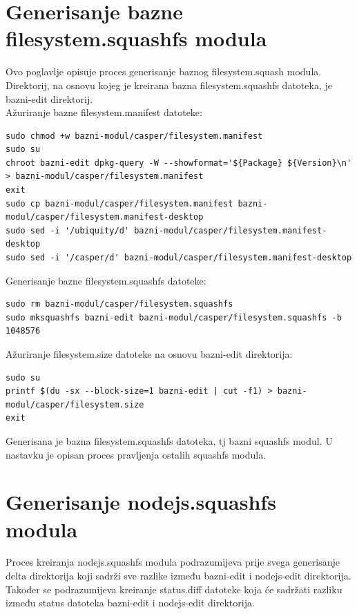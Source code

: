 \documentclass[12pt,vi]{mitthesis}
\begin{document}
\section*{Generisanje bazne filesystem.squashfs modula}
\indent
Ovo poglavlje opisuje proces generisanje baznog filesystem.squash modula. Direktorij, na osnovu kojeg je kreirana bazna filesystem.squashfs datoteka, je bazni-edit direktorij.\\
\noindent
Ažuriranje bazne filesystem.manifest datoteke:
\begin{lstlisting}[style=BashInputStyle]
sudo chmod +w bazni-modul/casper/filesystem.manifest
sudo su
chroot bazni-edit dpkg-query -W --showformat='${Package} ${Version}\n' > bazni-modul/casper/filesystem.manifest
exit
sudo cp bazni-modul/casper/filesystem.manifest bazni-modul/casper/filesystem.manifest-desktop
sudo sed -i '/ubiquity/d' bazni-modul/casper/filesystem.manifest-desktop
sudo sed -i '/casper/d' bazni-modul/casper/filesystem.manifest-desktop
\end{lstlisting}
\noindent
Generisanje bazne filesystem.squashfs datoteke:
\begin{lstlisting}[style=BashInputStyle]
sudo rm bazni-modul/casper/filesystem.squashfs
sudo mksquashfs bazni-edit bazni-modul/casper/filesystem.squashfs -b 1048576
\end{lstlisting}
\noindent
Ažuriranje filesystem.size datoteke na osnovu bazni-edit direktorija:
\begin{lstlisting}[style=BashInputStyle]
sudo su
printf $(du -sx --block-size=1 bazni-edit | cut -f1) > bazni-modul/casper/filesystem.size
exit
\end{lstlisting}
\noindent
Generisana je bazna filesystem.squashfs datoteka, tj bazni squashfs modul. U nastavku je opisan proces pravljenja ostalih squashfs modula.
\section*{Generisanje nodejs.squashfs modula}
\indent
Proces kreiranja nodejs.squashfs modula podrazumijeva prije svega generisanje delta direktorija koji sadrži sve razlike između bazni-edit i nodejs-edit direktorija. Također se podrazumijeva kreiranje status.diff datoteke koja će sadržati razliku između status datoteka bazni-edit i nodejs-edit direktorija.
\end{document}
